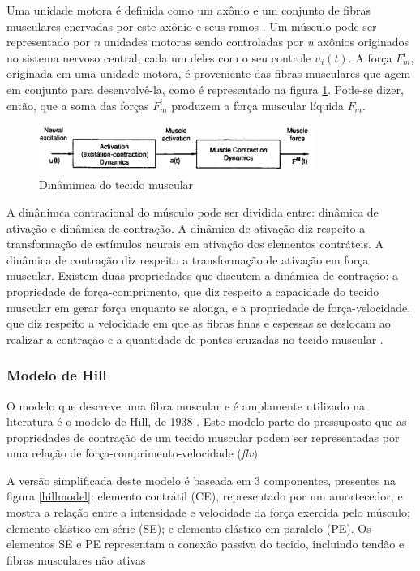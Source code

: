Uma unidade motora é definida como um axônio e um conjunto de fibras musculares enervadas por este axônio e seus ramos \cite{burke2011motor}. Um músculo pode ser representado por \textit{n} unidades motoras sendo controladas por \textit{n} axônios originados no sistema nervoso central, cada um deles com o seu controle $u_i(t)$. A força $F^i_m$, originada em uma unidade motora, é proveniente das fibras musculares que agem em conjunto para desenvolvê-la, como é representado na figura \ref{unidademotora}.  Pode-se dizer, então, que a soma das forças $F^i_m$ produzem a força muscular líquida $F_m$.

\begin{figure}[H]
\centering
\includegraphics[width = 0.8\textwidth]{img/Zajac1989_UnidadeMotora.JPG}
\caption[Representação da Produção de Força em uma Unidade Motora]{Dinâmimca do tecido muscular\cite{zajac1989muscle}}
\label{unidademotora}
\end{figure}

A dinânimca contracional do músculo pode ser dividida entre: dinâmica de ativação e dinâmica de contração. A dinâmica de ativação diz respeito a transformação de estímulos neurais em ativação dos elementos contráteis. A dinâmica de contração diz respeito a transformação de ativação em força muscular. Existem duas propriedades que discutem a dinâmica de contração: a propriedade de força-comprimento, que diz respeito a capacidade do tecido muscular em gerar força enquanto se alonga, e a propriedade de força-velocidade, que diz respeito a velocidade em que as fibras finas e espessas se deslocam ao realizar a contração e a quantidade de pontes cruzadas no tecido muscular \cite{zajac1989muscle}.

\subsubsection{Modelo de Hill}
O modelo que descreve uma fibra muscular e é amplamente utilizado na literatura é o modelo de Hill, de 1938 \cite{hill1938heat}. Este modelo parte do pressuposto que as propriedades de contração de um tecido muscular podem ser representadas por uma relação de força-comprimento-velocidade (\textit{flv}) 

A versão simplificada deste modelo é baseada em 3 componentes, presentes na figura \ref{hillmodel}: elemento contrátil (CE), representado por um amortecedor, e mostra a relação entre a intensidade e velocidade da força exercida pelo músculo; elemento elástico em série (SE); e elemento elástico em paralelo (PE). Os elementos SE e PE representam a conexão passiva do tecido, incluindo tendão e fibras musculares não ativas \cite{rosen1999performances}

